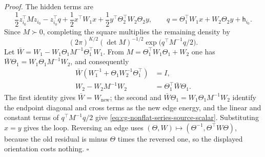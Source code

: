 \noindent\emph{Proof.}
The hidden terms are
\begin{equation}
\frac12z_{i_0}^\top Mz_{i_0}-z_{i_0}^\top q
+\frac12x^\top W_1x+\frac12y^\top\Theta_2^\top W_2\Theta_2y,
\qquad q=\Theta_1^\top W_1x+W_2\Theta_2y+\mathsf h_{i_0}.
\label{eq:cg-nonflat-series-square-data}
\end{equation}
Since \(M\succ0\), completing the square multiplies the remaining density by
\[
(2\pi)^{K/2}(\det M)^{-1/2}\exp\bigl(q^\top M^{-1}q/2\bigr).
\]
Let
\(\bar W=W_1-W_1\Theta_1M^{-1}\Theta_1^\top W_1\). From
\(M=\Theta_1^\top W_1\Theta_1+W_2\) one has
\(\bar W\Theta_1=W_1\Theta_1M^{-1}W_2\), and consequently
\begin{equation}
\begin{aligned}
\bar W(W_1^{-1}+\Theta_1W_2^{-1}\Theta_1^\top)&=I,\\
W_2-W_2M^{-1}W_2&=\Theta_1^\top \bar W\Theta_1 .
\end{aligned}
\label{eq:cg-nonflat-series-matrix-identities}
\end{equation}
The first identity gives \(\bar W=W_{\mathrm{new}}\); the second and
\(\bar W\Theta_1=W_1\Theta_1M^{-1}W_2\) identify the endpoint diagonal and cross
terms as the new edge energy, and the linear and constant terms of
\(q^\top M^{-1}q/2\) give \eqref{eq:cg-nonflat-series-source-scalar}.
Substituting \(x=y\) gives the loop. Reversing an edge uses
\((\Theta,W)\mapsto(\Theta^{-1},\Theta^\top W\Theta)\), because the old
residual is minus \(\Theta\) times the reversed one, so the displayed
orientation costs nothing. \(\square\)

